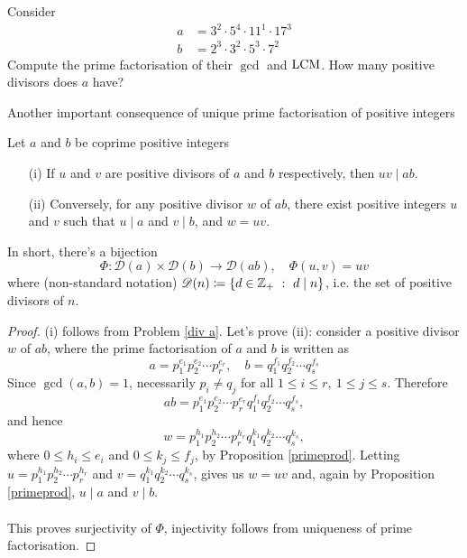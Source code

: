 \vspace*{1em}

\begin{example}[in-class]
Consider
\begin{align*}
a &= 3^2\cdot 5^4\cdot 11^1\cdot 17^3\\[0.5em]
b &= 2^3\cdot 3^2\cdot 5^3\cdot 7^2
\end{align*}
Compute the prime factorisation of their $\gcd$ and $\operatorname{LCM}$. How many positive divisors does $a$ have?
\end{example}


Another important consequence of unique prime factorisation of positive integers
\vspace*{0.5em}
\begin{theorem}\label{bijection}
Let $a$ and $b$ be coprime positive integers
\begin{itemize}
\item[(i)] If $u$ and $v$ are positive divisors of $a$ and $b$ respectively, then $uv \mid ab$. 
\item[(ii)] Conversely, for any positive divisor $w$ of $ab$, there exist positive integers $u$ and $v$ such that $u\mid a$ and $v\mid b$, and $w = uv$.
\end{itemize}
In short, there's a bijection
\[\Phi:\mathscr{D}(a) \times \mathscr{D}(b) \to \mathscr{D}(ab),\quad \Phi(u,v) = uv\]
where (non-standard notation) $\mathscr{D}(n) \coloneqq \left\{d \in \mathbb Z_+\ :\ d\mid n\right\}$, i.e. the set of positive divisors of $n$.
\end{theorem}
\begin{proof}
(i) follows from Problem \ref{div a}. Let's prove (ii): consider a positive divisor $w$ of $ab$, where the prime factorisation of $a$ and $b$ is written as
\[a = p_1^{e_1} p_2^{e_2}\cdots p_r^{e_r},\quad b = q_1^{f_1}q_2^{f_2}\cdots q_s^{f_s}\]
Since $\gcd(a,b) = 1$, necessarily $p_i \neq q_j$ for all $1\leq i \leq r,\ 1\leq j \leq s$. Therefore
\[ab = p_1^{e_1} p_2^{e_2}\cdots p_r^{e_r}q_1^{f_1}q_2^{f_2}\cdots q_s^{f_s},\]
and hence 
\[w = p_1^{h_1} p_2^{h_2}\cdots p_r^{h_r}q_1^{k_1}q_2^{k_2}\cdots q_s^{k_s},\]
where $0 \leq h_i \leq e_i$ and $0 \leq k_j \leq f_j$, by Proposition \ref{primeprod}. Letting $u = p_1^{h_1} p_2^{h_2}\cdots p_r^{h_r}$ and $v = q_1^{k_1}q_2^{k_2}\cdots q_s^{k_s}$, gives us $w = uv$ and, again by Proposition \ref{primeprod}, $u\mid a$ and $v\mid b$.\\
\\
This proves surjectivity of $\Phi$, injectivity follows from uniqueness of prime factorisation.
\end{proof}


